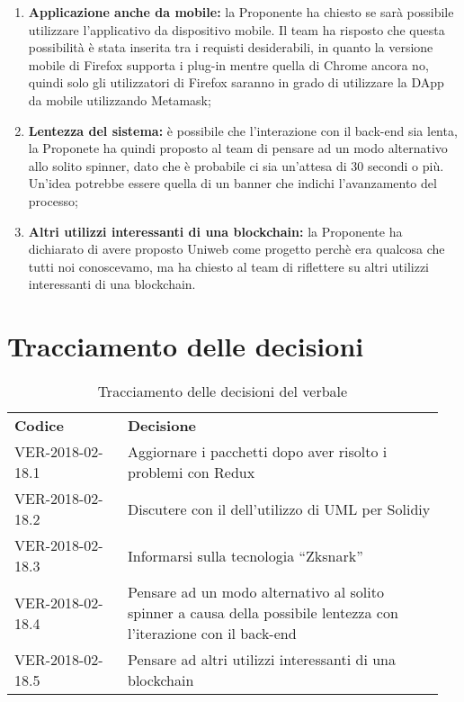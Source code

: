\documentclass[VER-2018-01-09.tex]{subfiles}
\begin{document}
\begin{enumerate}
	\item \textbf{Applicazione anche da mobile:} la Proponente ha chiesto se sarà possibile utilizzare l'applicativo da dispositivo mobile. Il team ha risposto che questa possibilità è stata inserita tra i requisti desiderabili, in quanto la versione mobile di Firefox supporta i plug-in mentre quella di Chrome ancora no, quindi solo gli utilizzatori di Firefox saranno in grado di utilizzare la DApp da mobile utilizzando Metamask;
	\item \textbf{Lentezza del sistema:} è possibile che l'interazione con il back-end sia lenta, la Proponete ha quindi proposto al team di pensare ad un modo alternativo allo solito spinner, dato che è probabile ci sia un'attesa di 30 secondi o più. Un'idea potrebbe essere quella di un banner che indichi l'avanzamento del processo;
	\item \textbf{Altri utilizzi interessanti di una blockchain:} la Proponente ha dichiarato di avere proposto Uniweb come progetto perchè era qualcosa che tutti noi conoscevamo, ma ha chiesto al team di riflettere su altri utilizzi interessanti di una blockchain.
\end{enumerate}

\section{Tracciamento delle decisioni}
\begin{table}[H]
	\begin{center}
		\begin{tabu} to 
			\tableHeaderStyle
			\textbf{Codice} & \textbf{Decisione} \\
			VER-2018-02-18.1 & Aggiornare i pacchetti dopo aver risolto i problemi con Redux \\
			VER-2018-02-18.2 & Discutere con il \Vardanega dell'utilizzo di UML per Solidiy \\
			VER-2018-02-18.3 & Informarsi sulla tecnologia \textquotedblleft Zksnark\textquotedblright \\
			VER-2018-02-18.4 & Pensare ad un modo alternativo al solito spinner a causa della possibile lentezza con l'iterazione con il back-end \\
			VER-2018-02-18.5 & Pensare ad altri utilizzi interessanti di una blockchain \\
		\end{tabu}
	\caption{Tracciamento delle decisioni del verbale}
	\end{center}
\end{table}
\end{document}
